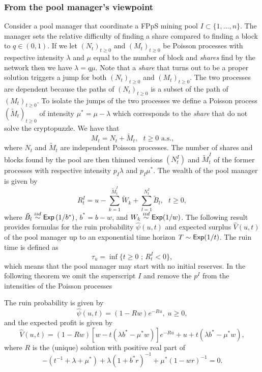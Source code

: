 \subsubsection{From the pool manager's viewpoint}\label{ssec:manager_viewpoint}
Consider a pool manager that coordinate a FPpS mining pool $I\subset\{1,\ldots, n\}$. The manager sets the relative difficulty of finding a share compared to finding a block to $q\in(0,1)$. If we let $(N_t)_{t\geq0}$ and $(M_t)_{t\geq0}$ be Poisson processes with respective intensity $\lambda$ and $\mu$ equal to the number of block and \textit{shares} find by the network then we have $\lambda = q\mu$. Note that a \textit{share} that turns out to be a proper solution triggers a jump for both $(N_t)_{t\geq0}$ and $(M_t)_{t\geq0}$. The two processes are dependent because the paths of $(N_t)_{t\geq0}$ is a subset of the path of $(M_t)_{t\geq0}$. To isolate the jumps of the two processes we define a Poisson process $(\tilde{M}_t)_{t\geq0}$ of intensity $\mu^{\ast} = \mu -\lambda$ which corresponds to the \textit{share} that do not solve the cryptopuzzle. We have that 
\[
M_t = N_t+\tilde{M}_t,\text{ }t\geq0\text{ a.s.,}
\] 
where $N_t$ and $\tilde{M}_t$ are independent Poisson processes. The number of shares and blocks found by the pool are then thinned versions $(N_t^I)$ and $\tilde{M}_t^{I}$ of the former processes with respective intensity $p_I\lambda$ and $p_I\mu^{\ast}$. The wealth of the pool manager is given by 
\begin{equation}\label{eq:wealth_pool_manager_fpps}
R^I_t = u - \sum_{k = 1}^{\tilde{M}^I_t}\tilde{W}_k + \sum_{l = 1}^{N_t^I}\tilde{B}_l,\text{ }t\geq0, 
\end{equation}
where $\tilde{B}_l\overset{iid}{\sim}\mathsf{Exp}\left(1/b^{\ast}\right)$, $b^{\ast} = b-w$, and $W_k\overset{iid}{\sim}\mathsf{Exp}(1/w)$. The following result provides formulas for the ruin probability $\widehat{\psi}(u,t)$ and expected surplus $\widehat{V}(u,t)$ of the pool manager up to an exponential time horizon $T\sim \mathsf{Exp}(1/t)$. The ruin time is defined as 
\[
\tau_u = \inf\{t\geq0\text{ ; }R^I_t<0\},
\]
which means that the pool manager may start with no initial reserves. In the following theorem we omit the superscript $I$ and remove the $p^{I}$ from the intensities of the Poisson processes
\begin{theo}
The ruin probability is given by 
\begin{equation*}\label{psiexpe}
    \widehat{\psi}(u,t) = (1-Rw)  e^{-R u},\;u\ge 0,
\end{equation*}
and the expected profit is given by
\begin{equation*}\label{Vcombexpe}
    \widehat{V}(u,t) = (1 - Rw)[w-t(\lambda b^\ast-\mu^\ast w)] e^{-R u}+u+t(\lambda b^\ast-\mu^\ast w),
\end{equation*}
where $R$ is the (unique) solution with positive real part of 
\begin{equation*} \label{VLunde}
    -(t^{-1}+\lambda+\mu^\ast)+\lambda(1+b^\ast r)^{-1}+\mu^\ast(1-wr)^{-1}=0.
\end{equation*}
\end{theo}
